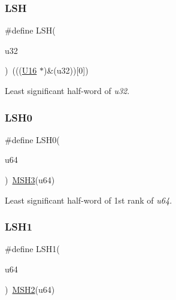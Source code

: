 \subsubsection{\texorpdfstring{LSH}{LSH}}
{\footnotesize\ttfamily \#define L\+SH(\begin{DoxyParamCaption}\item[{}]{u32 }\end{DoxyParamCaption})~(((\mbox{\hyperlink{group__group__sam0__utils_ga0a0a322d5fa4a546d293a77ba8b4a71f}{U16}} $\ast$)\&(u32))\mbox{[}0\mbox{]})}



Least significant half-\/word of {\itshape u32}. 

\mbox{\label{group__group__sam0__utils_ga3026b9288b45a9794fd3eb585cbe10bc}} 
\subsubsection{\texorpdfstring{LSH0}{LSH0}}
{\footnotesize\ttfamily \#define L\+S\+H0(\begin{DoxyParamCaption}\item[{}]{u64 }\end{DoxyParamCaption})~\mbox{\hyperlink{group__group__sam0__utils_gabb233f238b63c12d2ff361d9ddb3114b}{M\+S\+H3}}(u64)}



Least significant half-\/word of 1st rank of {\itshape u64}. 

\mbox{\label{group__group__sam0__utils_gac593b0be4555d883b4297b45cffc4168}} 
\subsubsection{\texorpdfstring{LSH1}{LSH1}}
{\footnotesize\ttfamily \#define L\+S\+H1(\begin{DoxyParamCaption}\item[{}]{u64 }\end{DoxyParamCaption})~\mbox{\hyperlink{group__group__sam0__utils_ga5d32ec744212194c8106c51b89a5dfe9}{M\+S\+H2}}(u64)}



